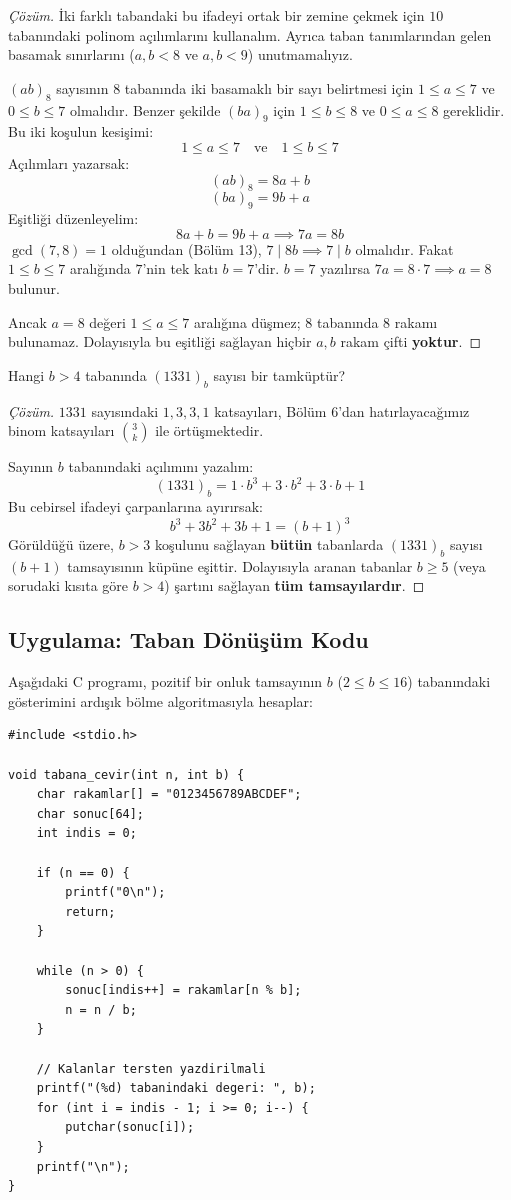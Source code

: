 \begin{proof}[Çözüm]
İki farklı tabandaki bu ifadeyi ortak bir zemine çekmek için $10$ tabanındaki polinom açılımlarını kullanalım. Ayrıca taban tanımlarından gelen basamak sınırlarını ($a, b < 8$ ve $a, b < 9$) unutmamalıyız.

$(ab)_8$ sayısının $8$ tabanında iki basamaklı bir sayı belirtmesi için $1 \le a \le 7$ ve $0 \le b \le 7$ olmalıdır. Benzer şekilde $(ba)_9$ için $1 \le b \le 8$ ve $0 \le a \le 8$ gereklidir. Bu iki koşulun kesişimi:
\[
1 \le a \le 7 \quad \text{ve} \quad 1 \le b \le 7
\]
Açılımları yazarsak:
\[
(ab)_8 = 8a + b
\]
\[
(ba)_9 = 9b + a
\]
Eşitliği düzenleyelim:
\[
8a + b = 9b + a \implies 7a = 8b
\]
$\gcd(7, 8) = 1$ olduğundan (Bölüm 13), $7 \mid 8b \implies 7 \mid b$ olmalıdır.
Fakat $1 \le b \le 7$ aralığında $7$'nin tek katı $b = 7$'dir.
$b = 7$ yazılırsa $7a = 8 \cdot 7 \implies a = 8$ bulunur.

Ancak $a=8$ değeri $1 \le a \le 7$ aralığına düşmez; $8$ tabanında $8$ rakamı bulunamaz.
Dolayısıyla bu eşitliği sağlayan hiçbir $a, b$ rakam çifti \textbf{yoktur}.
\end{proof}

\begin{example}
Hangi $b > 4$ tabanında $(1331)_b$ sayısı bir tamküptür?
\end{example}

\begin{proof}[Çözüm]
$1331$ sayısındaki $1, 3, 3, 1$ katsayıları, Bölüm 6'dan hatırlayacağımız binom katsayıları $\binom{3}{k}$ ile örtüşmektedir.

Sayının $b$ tabanındaki açılımını yazalım:
\[
(1331)_b = 1 \cdot b^3 + 3 \cdot b^2 + 3 \cdot b + 1
\]
Bu cebirsel ifadeyi çarpanlarına ayırırsak:
\[
b^3 + 3b^2 + 3b + 1 = (b + 1)^3
\]
Görüldüğü üzere, $b > 3$ koşulunu sağlayan \textbf{bütün} tabanlarda $(1331)_b$ sayısı $(b+1)$ tamsayısının küpüne eşittir.
Dolayısıyla aranan tabanlar $b \ge 5$ (veya sorudaki kısıta göre $b > 4$) şartını sağlayan \textbf{tüm tamsayılardır}.
\end{proof}

\subsection{Uygulama: Taban Dönüşüm Kodu}

Aşağıdaki C programı, pozitif bir onluk tamsayının $b$ ($2 \le b \le 16$) tabanındaki gösterimini ardışık bölme algoritmasıyla hesaplar:

\begin{lstlisting}[language=CTemel]
#include <stdio.h>

void tabana_cevir(int n, int b) {
    char rakamlar[] = "0123456789ABCDEF";
    char sonuc[64];
    int indis = 0;

    if (n == 0) {
        printf("0\n");
        return;
    }

    while (n > 0) {
        sonuc[indis++] = rakamlar[n % b];
        n = n / b;
    }

    // Kalanlar tersten yazdirilmali
    printf("(%d) tabanindaki degeri: ", b);
    for (int i = indis - 1; i >= 0; i--) {
        putchar(sonuc[i]);
    }
    printf("\n");
}
\end{lstlisting}

